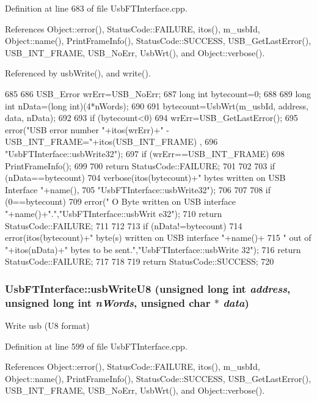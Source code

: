 Definition at line 683 of file UsbFTInterface.cpp.

References Object::error(), StatusCode::FAILURE, itos(), m\_\-usbId, Object::name(), PrintFrameInfo(), StatusCode::SUCCESS, USB\_\-GetLastError(), USB\_\-INT\_\-FRAME, USB\_\-NoErr, UsbWrt(), and Object::verbose().

Referenced by usbWrite(), and write().


\begin{DoxyCode}
685                                                               {
686   USB_Error wrErr=USB_NoErr;
687   long int  bytecount=0;
688 
689   long int nData=(long int)(4*nWords);
690 
691   bytecount=UsbWrt(m_usbId, address, data, nData);
692 
693   if (bytecount<0){
694     wrErr=USB_GetLastError();
695     error("USB error number "+itos(wrErr)+" - USB_INT_FRAME="+itos(USB_INT_FRAME)
      ,
696             "UsbFTInterface::usbWrite32");
697     if (wrErr==USB_INT_FRAME){
698       PrintFrameInfo();
699     } 
700     return StatusCode::FAILURE;
701   }
702 
703   if (nData==bytecount){
704     verbose(itos(bytecount)+" bytes written on USB Interface "+name(),
705             "UsbFTInterface::usbWrite32");
706   }
707   
708   if (0==bytecount){
709     error(" O Byte written on USB interface "+name()+".","UsbFTInterface::usbWrit
      e32");
710     return StatusCode::FAILURE;
711   }
712 
713   if (nData!=bytecount){
714     error(itos(bytecount)+" byte(s) written on USB interface "+name()+
715             " out of "+itos(nData)+" bytes to be sent.","UsbFTInterface::usbWrite
      32");
716     return StatusCode::FAILURE;    
717   }
718 
719   return StatusCode::SUCCESS;  
720 }
\end{DoxyCode}
\hypertarget{classUsbFTInterface_a8aeebce6a10aa88c19cfa663b47b389a}{
\subsubsection[{usbWriteU8}]{ UsbFTInterface::usbWriteU8 (unsigned long int {\em address}, \/  unsigned long int {\em nWords}, \/  unsigned char $\ast$ {\em data})}}
\label{classUsbFTInterface_a8aeebce6a10aa88c19cfa663b47b389a}
Write usb (U8 format) 

Definition at line 599 of file UsbFTInterface.cpp.

References Object::error(), StatusCode::FAILURE, itos(), m\_\-usbId, Object::name(), PrintFrameInfo(), StatusCode::SUCCESS, USB\_\-GetLastError(), USB\_\-INT\_\-FRAME, USB\_\-NoErr, UsbWrt(), and Object::verbose().

